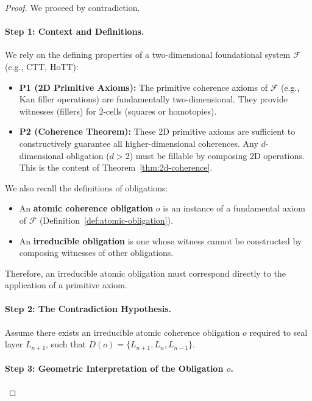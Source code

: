 \documentclass[11pt]{article}
\theoremstyle{definition}
\theoremstyle{remark}
\begin{document}
\begin{proof}
We proceed by contradiction.

\paragraph{Step 1: Context and Definitions.}

We rely on the defining properties of a two-dimensional foundational system $\mathcal{F}$ (e.g., CTT, HoTT):

\begin{itemize}
\item \textbf{P1 (2D Primitive Axioms):} The primitive coherence axioms of $\mathcal{F}$ (e.g., Kan filler
operations) are fundamentally two-dimensional. They provide witnesses (fillers) for 2-cells (squares
or homotopies).

\item \textbf{P2 (Coherence Theorem):} These 2D primitive axioms are sufficient to constructively
guarantee all higher-dimensional coherences. Any $d$-dimensional obligation ($d>2$) must be fillable
by composing 2D operations. This is the content of Theorem~\ref{thm:2d-coherence}.
\end{itemize}

We also recall the definitions of obligations:
\begin{itemize}
\item An \textbf{atomic coherence obligation} $o$ is an instance of a fundamental axiom of $\mathcal{F}$
(Definition~\ref{def:atomic-obligation}).
\item An \textbf{irreducible obligation} is one whose witness cannot be constructed by composing
witnesses of other obligations.
\end{itemize}

Therefore, an irreducible atomic obligation must correspond directly to the application of a primitive
axiom.

\paragraph{Step 2: The Contradiction Hypothesis.}

Assume there exists an irreducible atomic coherence obligation $o$ required to seal layer $L_{n+1}$,
such that $D(o) = \{L_{n+1}, L_n, L_{n-1}\}$.

\paragraph{Step 3: Geometric Interpretation of the Obligation $o$.}


\end{proof}
\end{document}
